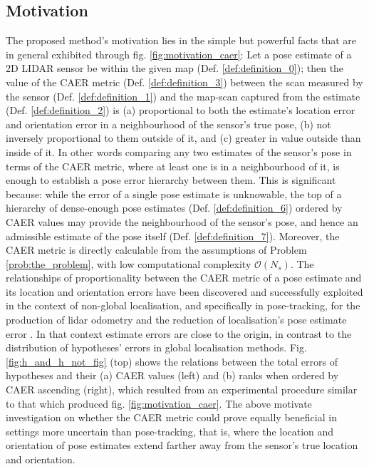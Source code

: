 \subsection{Motivation}
\label{subsec:motivation}

The proposed method's motivation lies in the simple but powerful facts that are
in general exhibited through fig. \ref{fig:motivation_caer}: Let a pose
estimate of a 2D LIDAR sensor be within the given map (Def.
\ref{def:definition_0}); then the value of the CAER metric (Def.
\ref{def:definition_3}) between the scan measured by the sensor (Def.
\ref{def:definition_1}) and the map-scan captured from the estimate (Def.
\ref{def:definition_2}) is (a) proportional to both the estimate's location
error and orientation error in a neighbourhood of the sensor's true pose, (b)
not inversely proportional to them outside of it, and (c) greater in value
outside than inside of it. In other words comparing any two estimates of
the sensor's pose in terms of the CAER metric, where at least one is in a
neighbourhood of it, is enough to establish a pose error hierarchy between
them.  This is significant because: while the error of a single pose estimate
is unknowable, the top of a hierarchy of dense-enough pose estimates (Def.
\ref{def:definition_6}) ordered by CAER values may provide the neighbourhood of
the sensor's pose, and hence an admissible estimate of the pose itself (Def.
\ref{def:definition_7}).  Moreover, the CAER metric is directly calculable from
the assumptions of Problem \ref{prob:the_problem}, with low computational
complexity $\mathcal{O}(N_s)$.  The relationships of proportionality between
the CAER metric of a pose estimate and its location and orientation errors have
been discovered and successfully exploited in the context of non-global
localisation, and specifically in pose-tracking, for the production of lidar
odometry \cite{Filotheou2022f} and the reduction of localisation's pose
estimate error \cite{Filotheou2023a}. In that context estimate errors are close
to the origin, in contrast to the distribution of hypotheses' errors in global
localisation methods.  Fig. \ref{fig:h_and_h_not_fig} (top) shows the relations
between the total errors of hypotheses and their (a) CAER values (left) and (b)
ranks when ordered by CAER ascending (right), which resulted from an
experimental procedure similar to that which produced fig.
\ref{fig:motivation_caer}. The above motivate investigation on whether the CAER
metric could prove equally beneficial in settings more uncertain than
pose-tracking, that is, where the location and orientation of pose estimates
extend farther away from the sensor's true location and orientation.



